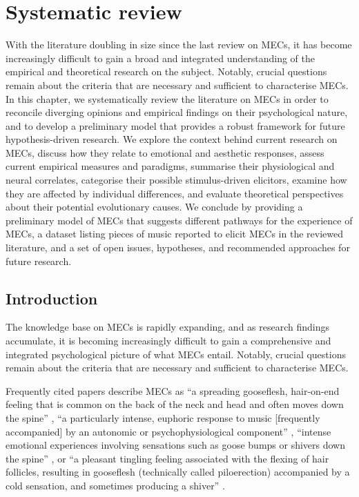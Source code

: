 
\chapter{Systematic review}
\label{ch:2}

With the literature doubling in size since the last review on MECs, it has become increasingly difficult to gain a broad and integrated understanding of the empirical and theoretical research on the subject. Notably, crucial questions remain about the criteria that are necessary and sufficient to characterise MECs. In this chapter, we systematically review the literature on MECs in order to reconcile diverging opinions and empirical findings on their psychological nature, and to develop a preliminary model that provides a robust framework for future hypothesis-driven research. We explore the context behind current research on MECs, discuss how they relate to emotional and aesthetic responses, assess current empirical measures and paradigms, summarise their physiological and neural correlates, categorise their possible stimulus-driven elicitors, examine how they are affected by individual differences, and evaluate theoretical perspectives about their potential evolutionary causes. We conclude by providing a preliminary model of MECs that suggests different pathways for the experience of MECs, a dataset listing pieces of music reported to elicit MECs in the reviewed literature, and a set of open issues, hypotheses, and recommended approaches for future research.

\section{Introduction}
\label{se:rev-intro}

The knowledge base on MECs is rapidly expanding, and as research findings accumulate, it is becoming increasingly difficult to gain a comprehensive and integrated psychological picture of what MECs entail. Notably, crucial questions remain about the criteria that are necessary and sufficient to characterise MECs.

Frequently cited papers describe MECs as ``a spreading gooseflesh, hair-on-end feeling that is common on the back of the neck and head and often moves down the spine'' \parencite[p. 173]{panksepp1995}, ``a particularly intense, euphoric response to music [frequently accompanied] by an autonomic or psychophysiological component'' \parencite[p. 11818]{blood2001}, ``intense emotional experiences involving sensations such as goose bumps or shivers down the spine'' \parencite[p. 131]{koelsch2010}, or ``a pleasant tingling feeling associated with the flexing of hair follicles, resulting in gooseflesh (technically called piloerection) accompanied by a cold sensation, and sometimes producing a shiver'' \parencite[p. 591]{huron2010}.


